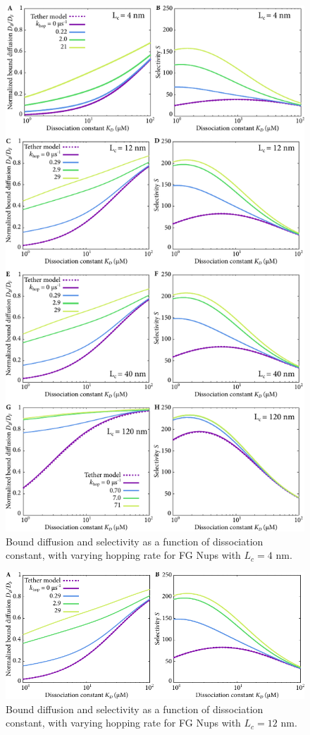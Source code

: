 \begin{figure}[h]
\centering
\includegraphics[width=0.7\linewidth]{figs/ch02/hopping_lc4-fig.pdf}
\caption{Bound diffusion and selectivity as a function of dissociation
  constant, with varying hopping rate for FG Nups with $L_c = 4$ nm.}
\label{fig:partitioningB}
\end{figure}
\begin{figure}[h]
\centering
\includegraphics[width=0.7\linewidth]{figs/ch02/hopping_lc12-fig.pdf}
\caption{Bound diffusion and selectivity as a function of dissociation
  constant, with varying hopping rate for FG Nups with $L_c = 12$ nm.}
\label{fig:partitioningC}
\end{figure}
